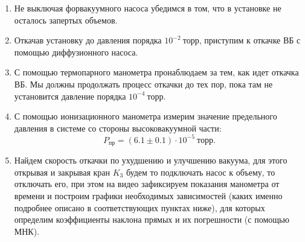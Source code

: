 \documentclass[11pt,a4paper]{article}
\begin{document}
	\begin{enumerate}
		
		\item Не выключая форвакуумного насоса убедимся в том, что в установке не осталось запертых объемов. 
		
		\item Откачав установку до давления порядка $ 10^{-2}~торр$, приступим к откачке ВБ с помощью диффузионного насоса. 
		
		
		\item С помощью термопарного манометра пронаблюдаем за тем, как идет откачка ВБ. Мы должны продолжать процесс откачки до тех пор, пока там не установится давление порядка $10^{-4}~\text{торр}.$ 
		
		\item С помощью ионизационного манометра измерим значение предельного давления в системе со стороны высоковакуумной части: $$P_\text{пр} = (6.1 \pm 0.1)  \cdot 10^{-5} ~\text{торр}.$$
		
		
		\item Найдем скорость откачки по ухудшению и улучшению вакуума, для этого открывая и закрывая кран $K_3$ будем то подключать насос к объему, то отключать его, при этом на видео зафиксируем показания манометра от времени и построим графики необходимых  зависимостей (каких именно подробнее описано в соответствующих пунктах ниже), для которых определим коэффициенты наклона прямых и их погрешности (с помощью МНК).
		

\end{enumerate}
\end{document}
